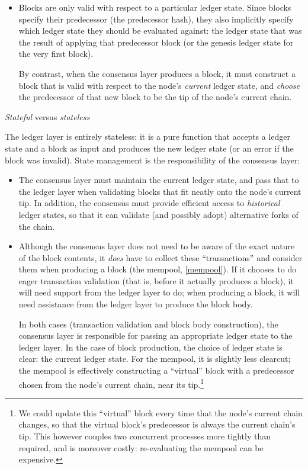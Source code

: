\begin{description}
\begin{itemize}
\item Blocks are only valid with respect to a particular ledger state. Since
blocks specify their predecessor (the predecessor hash), they also implicitly
specify which ledger state they should be evaluated against: the ledger state
that was the result of applying that predecessor block (or the genesis ledger
state for the very first block).

By contrast, when the consensus layer produces a block, it must construct a
block that is valid with respect to the node's \emph{current} ledger state, and
\emph{choose} the predecessor of that new block to be the tip of the node's
current chain.

\end{itemize}

\item{\emph{Stateful} versus \emph{stateless}}

The ledger layer is entirely stateless: it is a pure function that accepts a
ledger state and a block as input and produces the new ledger state (or an
error if the block was invalid). State management is the responsibility of
the consensus layer:

\begin{itemize}

\item The consensus layer must maintain the current ledger state, and pass that
to the ledger layer when validating blocks that fit neatly onto the node's
current tip. In addition, the consensus must provide efficient access to
\emph{historical} ledger states, so that it can validate (and possibly adopt)
alternative forks of the chain.

\item Although the consensus layer does not need to be aware of the exact nature
of the block contents, it \emph{does} have to collect these ``transactions'' and
consider them when producing a block (the mempool, \cref{mempool}). If it
chooses to do eager transaction validation (that is, before it actually produces
a block), it will need support from the ledger layer to do; when producing a
block, it will need assistance from the ledger layer to produce the block body.

In both cases (transaction validation and block body construction), the
consensus layer is responsible for passing an appropriate ledger state to the
ledger layer. In the case of block production, the choice of ledger state is
clear: the current ledger state. For the mempool, it is slightly less clearcut;
the mempool is effectively constructing a ``virtual'' block with a predecessor
chosen from the node's current chain, near its tip.\footnote{We could update
this ``virtual'' block every time that the node's current chain changes, so that
the virtual block's predecessor is always the current chain's tip. This however
couples two concurrent processes more tightly than required, and is moreover
costly: re-evaluating the mempool can be expensive.}

\end{itemize}

\end{description}

